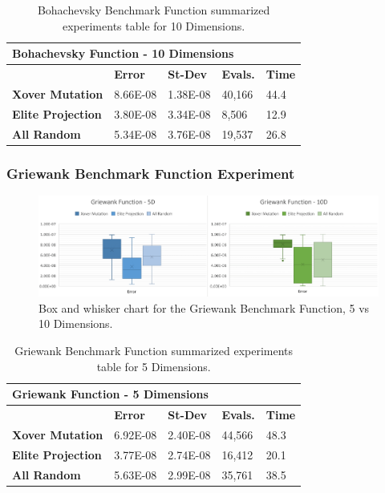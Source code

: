 \documentclass[graybox]{svmult}
\begin{document}
    \begin{table}[]
        \scriptsize
        \centering
        \caption{Bohachevsky Benchmark Function summarized experiments table for 10 Dimensions.}\label{tab.fun_bohachevsky10}
        \begin{tabular}{@{}lllll@{}}
        \toprule
        \multicolumn{5}{l}{\textbf{Bohachevsky Function - 10 Dimensions}} \\ \midrule
        & \textbf{Error} & \textbf{St-Dev} & \textbf{Evals.} & \textbf{Time} \\
        \textbf{Xover Mutation} & 8.66E-08 & 1.38E-08 & 40,166 & 44.4 \\
        \textbf{Elite Projection} & 3.80E-08 & 3.34E-08 & 8,506 & 12.9 \\
        \textbf{All Random} & 5.34E-08 & 3.76E-08 & 19,537 & 26.8 \\ \bottomrule
        \end{tabular}
        \end{table}


\subsubsection{Griewank Benchmark Function Experiment}

    \begin{figure}
        \includegraphics[width=\linewidth, frame]{img/fig_fun_griewank.pdf}
        \caption{Box and whisker chart for the Griewank Benchmark Function, 5 vs 10 Dimensions.} \label{fig.fun_griewank}
        \end{figure}

    \begin{table}[]
        \scriptsize
        \centering
        \caption{Griewank Benchmark Function summarized experiments table for 5 Dimensions.}\label{tab.fun_griewank5}
        \begin{tabular}{@{}lllll@{}}
        \toprule
        \multicolumn{5}{l}{\textbf{Griewank Function - 5 Dimensions}} \\ \midrule
        & \textbf{Error} & \textbf{St-Dev} & \textbf{Evals.} & \textbf{Time} \\
        \textbf{Xover Mutation} & 6.92E-08 & 2.40E-08 & 44,566 & 48.3 \\
        \textbf{Elite Projection} & 3.77E-08 & 2.74E-08 & 16,412 & 20.1 \\
        \textbf{All Random} & 5.63E-08 & 2.99E-08 & 35,761 & 38.5 \\ \bottomrule
        \end{tabular}
        \end{table}
\end{document}
